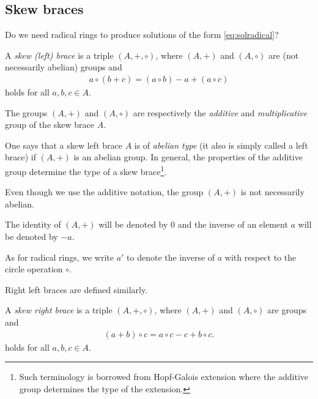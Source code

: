     \subsection{Skew braces}
    Do we need radical rings to produce solutions of the form \eqref{eq:solradical}?

    \begin{definition}
         A \emph{skew (left) brace} is a triple $(A,+,\circ)$, where 
        $(A,+)$ and $(A,\circ)$ 
    	are (not necessarily abelian) 
    	groups and 
    	\begin{align}\label{compatibility}
    	    a\circ(b+c)=(a\circ b)-a+(a\circ c)
    	\end{align}
    	holds for all $a,b,c\in A$. 
    
    The groups $(A,+)$ and $(A,\circ)$ are respectively the \emph{additive} and \emph{multiplicative} group	of the skew brace $A$.
    \end{definition}

    One says that a skew left brace $A$ is of \emph{abelian type} (it also is simply called a left brace) if $(A,+)$ is an abelian group. 
    In general, the properties of the additive group determine the type of a skew brace\footnote{Such terminology is borrowed from Hopf-Galois extension where the additive group determines the type of the extension.}.
    
    \begin{remark}
        Even though we use the additive notation, the group $(A,+)$ is not necessarily abelian.
    \end{remark}

    \begin{convention}
         The identity of $(A,+)$ will be denoted by $0$ and the inverse of an element $a$ will be denoted by $-a$. 

         As for radical rings, we write $a'$ to denote the inverse of $a$ with respect to the circle operation $\circ$. 
    \end{convention}
        
    Right left braces are defined similarly.

    \begin{definition}
         A \emph{skew right brace} is a triple $(A,+,\circ)$, where 
        $(A,+)$ and $(A,\circ)$ 
	   are groups and 
	   \begin{align*}
	       (a+b)\circ c=a\circ c-c+b\circ c.
	   \end{align*}
	   holds for all $a,b,c\in A$. 
    \end{definition}

